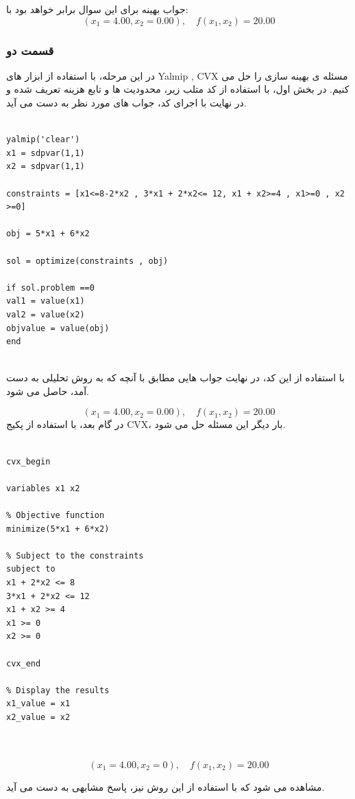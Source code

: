 جواب بهینه برای این سوال برابر خواهد بود با:
	\[
	(x_1 = 4.00, x_2 = 0.00) , \quad f(x_1, x_2) = 20.00
	\]
\subsubsection{قسمت دو}
در این مرحله، با استفاده از ابزار های 
Yalmip
, 
CVX
مسئله ی بهینه سازی را حل می کنیم. در بخش اول، با استفاده از کد متلب زیر، محدودیت ها و تابع هزینه تعریف شده و در نهایت با اجرای کد، جواب های مورد نظر به دست می آید.

\begin{latin}
	\begin{lstlisting}[frame=single,style=Matlab-Pyglike]
		
yalmip('clear')
x1 = sdpvar(1,1)
x2 = sdpvar(1,1)

constraints = [x1<=8-2*x2 , 3*x1 + 2*x2<= 12, x1 + x2>=4 , x1>=0 , x2 >=0]

obj = 5*x1 + 6*x2

sol = optimize(constraints , obj)

if sol.problem ==0
val1 = value(x1)
val2 = value(x2)
objvalue = value(obj)
end
		
	\end{lstlisting}
\end{latin}

با استفاده از این کد، در نهایت جواب هایی مطابق با آنچه که به روش تحلیلی به دست آمد، حاصل می شود.

\[
(x_1 = 4.00, x_2 = 0.00) , \quad f(x_1, x_2) = 20.00
\]
در گام بعد، با استفاده از پکیج CVX، بار دیگر این مسئله حل می شود.


\begin{latin}
	\begin{lstlisting}[frame=single,style=Matlab-Pyglike]
		
cvx_begin

variables x1 x2

% Objective function
minimize(5*x1 + 6*x2)

% Subject to the constraints
subject to
x1 + 2*x2 <= 8
3*x1 + 2*x2 <= 12
x1 + x2 >= 4
x1 >= 0
x2 >= 0

cvx_end

% Display the results
x1_value = x1
x2_value = x2

		
	\end{lstlisting}
\end{latin}

\[
(x_1 = 4.00, x_2 = 0) , \quad f(x_1, x_2) = 20.00
\]

مشاهده می شود که با استفاده از این روش نیز، پاسخ مشابهی به دست می آید.

